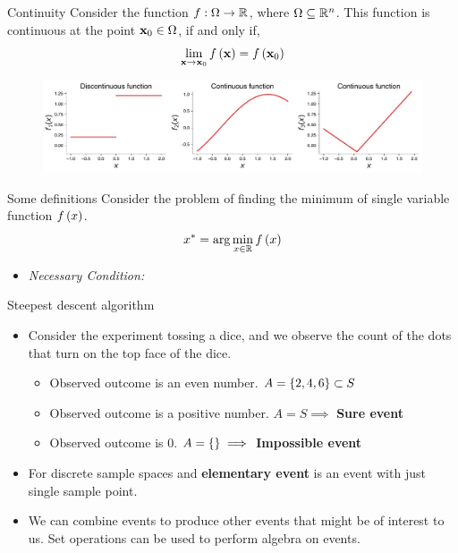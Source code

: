 \documentclass[aspectratio=169]{beamer}
\let\olditem\item
\renewcommand{\item}{\setlength{\itemsep}{\fill}\olditem}
\def\mf{\ensuremath\mathbf}
\def\mb{\ensuremath\mathbb}
\def\lp{\ensuremath\left(}
\def\rp{\ensuremath\right)}
\def\lc{\ensuremath\left\{}
\def\rc{\ensuremath\right\}}
\def\R{\ensuremath\mb{R}}
\newcommand{\ct}[1]{\lp #1\rp}
\begin{document}
\begin{frame}[t]{Continuity}
  Consider the function $f: \Omega \to \R$, where $\Omega \subseteq \R^n$. This function is continuous at the point $\mf{x}_0 \in \Omega$, if and only if, 
  \[ \lim_{\mf{x} \to \mf{x}_0} f\ct{\mf{x}} = f\ct{\mf{x}_0} \]
  
  \begin{figure}
    \centering
    \includegraphics[width=\textwidth]{figs/func_cont.pdf}
  \end{figure}
\end{frame}


\begin{frame}[t]{Some definitions}
  Consider the problem of finding the minimum of single variable function $f\ct{x}$.
  \[ x^{*} = \arg \min_{x \in \R} f\ct{x} \] 
\begin{itemize}
  \item \textit{Necessary Condition:} 
\end{itemize}
\end{frame}


\begin{frame}[t]{Steepest descent algorithm}
\begin{itemize}
  \item Consider the experiment tossing a dice, and we observe the count of the dots that turn on the top face of the dice.
  \begin{itemize}
    \item Observed outcome is an even number. $A = \lc 2, 4, 6\rc \subset S$
    \item Observed outcome is a positive number. $A = S \implies $ \textbf{Sure event}
    \item Observed outcome is 0. $A = \lc\rc \implies $ \textbf{Impossible event}
  \end{itemize}
  
  \item For discrete sample spaces and \textbf{elementary event} is an event with just single sample point.
  
  \item We can combine events to produce other events that might be of interest to us. Set operations can be used to perform algebra on events.
\end{itemize}
\end{frame}
\end{document}
